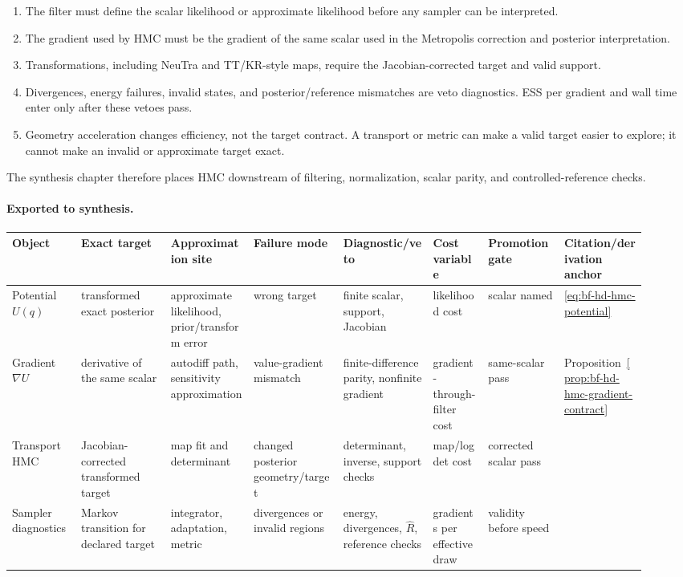 \begin{enumerate}[label=(\arabic*)]
  \item The filter must define the scalar likelihood or approximate likelihood
  before any sampler can be interpreted.
  \item The gradient used by HMC must be the gradient of the same scalar used in
  the Metropolis correction and posterior interpretation.
  \item Transformations, including NeuTra and TT/KR-style maps, require the
  Jacobian-corrected target and valid support.
  \item Divergences, energy failures, invalid states, and posterior/reference
  mismatches are veto diagnostics.  ESS per gradient and wall time enter only
  after these vetoes pass.
  \item Geometry acceleration changes efficiency, not the target contract.  A
  transport or metric can make a valid target easier to explore; it cannot make
  an invalid or approximate target exact.
\end{enumerate}

The synthesis chapter therefore places HMC downstream of filtering,
normalization, scalar parity, and controlled-reference checks.

\paragraph{Exported to synthesis.}
\begingroup
\scriptsize
\setlength{\tabcolsep}{2pt}
\begin{longtable}{@{}p{0.10\linewidth}p{0.13\linewidth}p{0.12\linewidth}p{0.13\linewidth}p{0.13\linewidth}p{0.08\linewidth}p{0.11\linewidth}p{0.12\linewidth}@{}}
\toprule
Object & Exact target & Approximation site & Failure mode & Diagnostic/veto &
Cost variable & Promotion gate & Citation/derivation anchor \\
\midrule
\endhead
Potential \(U(q)\) & transformed exact posterior & approximate likelihood,
prior/transform error & wrong target & finite scalar, support, Jacobian &
likelihood cost & scalar named & \eqref{eq:bf-hd-hmc-potential} \\
Gradient \(\nabla U\) & derivative of the same scalar & autodiff path,
sensitivity approximation & value-gradient mismatch & finite-difference
parity, nonfinite gradient & gradient-through-filter cost & same-scalar pass &
Proposition~\ref{prop:bf-hd-hmc-gradient-contract} \\
Transport HMC & Jacobian-corrected transformed target & map fit and determinant
& changed posterior geometry/target & determinant, inverse, support checks &
map/logdet cost & corrected scalar pass &
\citet{parno2018transport,hoffman2019neutra} \\
Sampler diagnostics & Markov transition for declared target & integrator,
adaptation, metric & divergences or invalid regions & energy, divergences,
\(\widehat R\), reference checks & gradients per effective draw & validity
before speed & \citet{neal2011mcmc,hoffman2014nuts,betancourt2017conceptual} \\
\bottomrule
\end{longtable}
\endgroup

